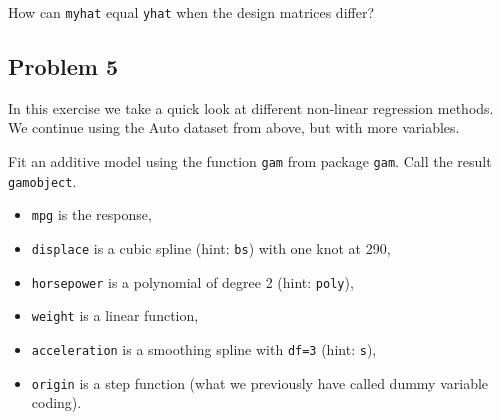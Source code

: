 \documentclass[]{article}
\newenvironment{Shaded}{\begin{snugshade}}{\end{snugshade}}
\newcommand{\KeywordTok}[1]{\textcolor[rgb]{0.13,0.29,0.53}{\textbf{#1}}}
\newcommand{\DataTypeTok}[1]{\textcolor[rgb]{0.13,0.29,0.53}{#1}}
\newcommand{\DecValTok}[1]{\textcolor[rgb]{0.00,0.00,0.81}{#1}}
\newcommand{\StringTok}[1]{\textcolor[rgb]{0.31,0.60,0.02}{#1}}
\newcommand{\CommentTok}[1]{\textcolor[rgb]{0.56,0.35,0.01}{\textit{#1}}}
\newcommand{\OperatorTok}[1]{\textcolor[rgb]{0.81,0.36,0.00}{\textbf{#1}}}
\newcommand{\NormalTok}[1]{#1}
\providecommand{\tightlist}{%
  \setlength{\itemsep}{0pt}\setlength{\parskip}{0pt}}
\begin{document}
\begin{Shaded}
\end{Shaded}

How can \texttt{myhat} equal \texttt{yhat} when the design matrices
differ?

\subsection{Problem 5}\label{problem-5}

In this exercise we take a quick look at different non-linear regression
methods. We continue using the Auto dataset from above, but with more
variables.

Fit an additive model using the function \texttt{gam} from package
\texttt{gam}. Call the result \texttt{gamobject}.

\begin{itemize}
\tightlist
\item
  \texttt{mpg} is the response,
\item
  \texttt{displace} is a cubic spline (hint: \texttt{bs}) with one knot
  at 290,
\item
  \texttt{horsepower} is a polynomial of degree 2 (hint: \texttt{poly}),
\item
  \texttt{weight} is a linear function,
\item
  \texttt{acceleration} is a smoothing spline with \texttt{df=3} (hint:
  \texttt{s}),
\item
  \texttt{origin} is a step function (what we previously have called
  dummy variable coding).
\end{itemize}
\end{document}
